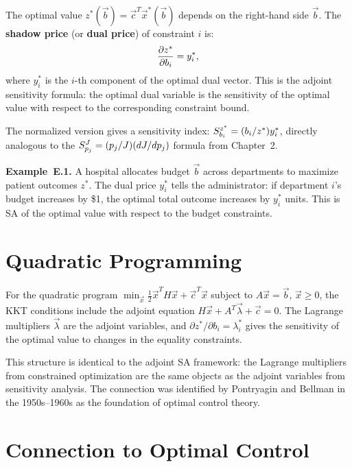 The optimal value $z^*(\vec{b}) = \vec{c}^T\vec{x}^*(\vec{b})$
depends on the right-hand side $\vec{b}$.
The \textbf{shadow price} (or \textbf{dual price}) of constraint $i$ is:
\begin{equation}
  \frac{\partial z^*}{\partial b_i} = y_i^*,
  \label{eq:shadowprice}
\end{equation}
where $y_i^*$ is the $i$-th component of the optimal dual vector.
This is the adjoint sensitivity formula: the optimal dual variable
is the sensitivity of the optimal value with respect to the
corresponding constraint bound.

The normalized version gives a sensitivity index:
$S_{b_i}^{z^*} = (b_i/z^*)y_i^*$, directly analogous to the
$S_{p_j}^{J} = (p_j/J)(dJ/dp_j)$ formula from Chapter~2.

\textbf{Example~E.1.} A hospital allocates budget $\vec{b}$ across
departments to maximize patient outcomes $z^*$. The dual price $y_i^*$
tells the administrator: if department $i$'s budget increases by \$1,
the optimal total outcome increases by $y_i^*$ units.
This is SA of the optimal value with respect to the budget constraints.

\section{Quadratic Programming}
\label{appsec:QP}

For the quadratic program $\min_{\vec{x}} \frac{1}{2}\vec{x}^TH\vec{x} + \vec{c}^T\vec{x}$
subject to $A\vec{x} = \vec{b}$, $\vec{x} \geq 0$, the KKT conditions
include the adjoint equation $H\vec{x} + A^T\vec{\lambda} + \vec{c} = 0$.
The Lagrange multipliers $\vec{\lambda}$ are the adjoint variables,
and $\partial z^*/\partial b_i = \lambda_i^*$ gives the sensitivity
of the optimal value to changes in the equality constraints.

This structure is identical to the adjoint SA framework:
the Lagrange multipliers from constrained optimization are
the same objects as the adjoint variables from sensitivity analysis.
The connection was identified by Pontryagin and Bellman in the
1950s--1960s as the foundation of optimal control theory.

\section{Connection to Optimal Control}
\label{appsec:optcontrol}

